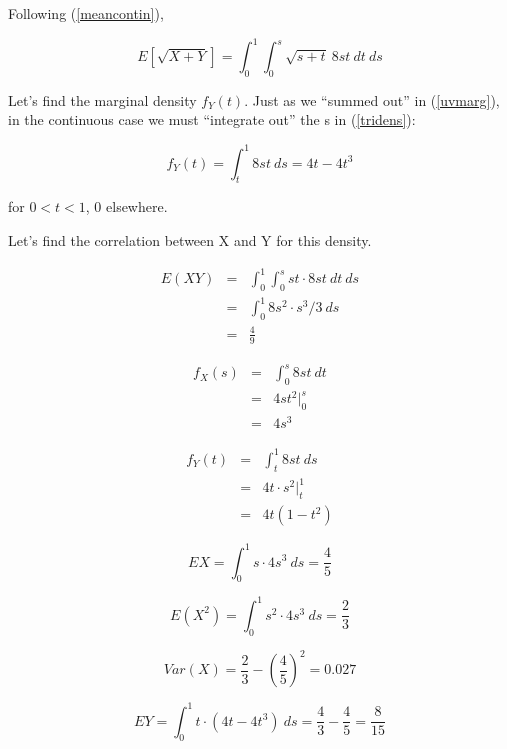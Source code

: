 Following (\ref{meancontin}), 

\begin{equation}
\label{eofsqrt}
E[\sqrt{X+Y}] = \int_{0}^{1} \int_{0}^{s} \sqrt{s+t} ~ 8st ~ dt ~ ds
\end{equation}

Let's find the marginal density $f_Y(t)$.  Just as we ``summed out'' in
(\ref{uvmarg}), in the continuous case we must ``integrate out'' the s
in (\ref{tridens}):

\begin{equation}
\label{ydens}
f_Y(t) = \int_{t}^{1} 8st ~ ds = 4t - 4t^3
\end{equation}

for $0 < t < 1$, 0 elsewhere.

Let's find the correlation between X and Y for this density. 

\begin{eqnarray}
E(XY) &=& 
\int_{0}^{1} \int_{0}^{s} st \cdot 8st ~ dt ~ ds \\
&=& \int_{0}^{1} 8s^2 \cdot s^3/3 ~ ds \\
&=& \frac{4}{9}
\end{eqnarray}

\begin{eqnarray}
f_X(s) &=& \int_{0}^{s} 8st ~ dt \\ 
&=& 4s t^2 \Big |_0^s \\
&=& 4s^3 
\end{eqnarray}

\begin{eqnarray}
f_Y(t) &=& \int_{t}^{1} 8st ~ ds \\ 
&=& 4t \cdot s^2 \Big |_t^1 \\
&=& 4t (1-t^2)
\end{eqnarray}

\begin{equation}
EX = \int_{0}^{1} s \cdot 4s^3 ~ ds  = \frac{4}{5}
\end{equation}

\begin{equation}
E(X^2) = \int_{0}^{1} s^2 \cdot 4s^3 ~ ds  = \frac{2}{3}
\end{equation}

\begin{equation}
Var(X) =  \frac{2}{3} - \left (\frac{4}{5} \right )^2 = 0.027
\end{equation}

\begin{equation}
EY = \int_{0}^{1} t \cdot (4t-4t^3)  ~ ds  
= \frac{4}{3} - \frac{4}{5}
= \frac{8}{15}
\end{equation}

